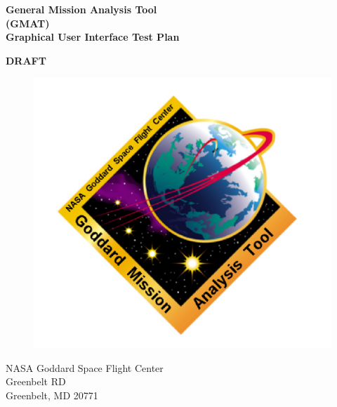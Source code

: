 \documentclass[letterpaper,10pt]{book}
\begin{document}
\thispagestyle{empty}
\begin{center}
{\renewcommand{\thefootnote}{\fnsymbol{footnote}} { \Huge \bf
General Mission Analysis Tool\\ (GMAT)\\ Graphical User Interface
Test Plan }}
\end{center}
\begin{center}
{\renewcommand{\thefootnote}{\fnsymbol{footnote}} { \Huge \bf
 DRAFT }}
\end{center}

\vspace{1.0 in}

\begin{figure}[ht]
\begin{center}
\includegraphics[421,303]{Images/GMATSplash.png}
\end{center}
\end{figure}
%
\begin{center}
\Large{NASA Goddard Space Flight Center\\
Greenbelt RD\\
Greenbelt, MD 20771}
\end{center}

\clearpage\clearpage


\end{document}
